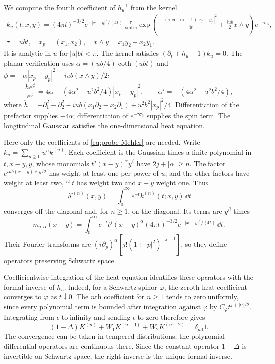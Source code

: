 \documentclass[11pt,letterpaper,reqno]{amsart}
\begin{document}
We compute the fourth coefficient of $h_u^{-1}$ from the kernel
\begin{multline}\label{eq:probe-Mehler}
 k_u(t;x,y)=(4\pi t)^{-3/2}e^{-|x-y|^2/(4t)}
 \frac{\tau}{\sinh\tau}\exp\left(-\frac{(\tau\coth\tau-1)|x_p-y_p|^2}{4t}
                           +\frac{iub}{2}x\wedge y\right)
 e^{-\tau\sigma_3},\\
 \tau=ubt,\quad x_p=(x_1,x_2),\quad x\wedge y=x_1y_2-x_2y_1.
\end{multline}
It is analytic in $u$ for $|u|bt<\pi$. The kernel satisfies
$(\partial_t+h_u-1)k_u=0$. The planar verification uses
$\alpha=(ub/4)\coth(ubt)$ and
$\phi=-\alpha|x_p-y_p|^2+iub(x\wedge y)/2$:
\[
 \frac{\check h e^\phi}{e^\phi}
   =4\alpha-(4\alpha^2-u^2b^2/4)|x_p-y_p|^2,
 \qquad \alpha'=-(4\alpha^2-u^2b^2/4),
\]
where $\check h=-\partial_1^2-\partial_2^2
-iub(x_1\partial_2-x_2\partial_1)+u^2b^2|x_p|^2/4$.
Differentiation of the prefactor supplies $-4\alpha$; differentiation
of $e^{-\tau\sigma_3}$ supplies the spin term. The longitudinal
Gaussian satisfies the one-dimensional heat equation.

Here only the coefficients of \eqref{eq:probe-Mehler} are needed.
Write $k_u=\sum_{n\ge0}u^nk^{(n)}$. Each coefficient is the Gaussian
times a finite polynomial in $t,x-y,y$, whose monomials
$t^j(x-y)^\alpha y^\beta$ have $2j+|\alpha|\ge n$.
The factor $e^{iub(x-y)\wedge y/2}$ has weight at least one per
power of $u$, and the other factors have weight at least two,
if $t$ has weight two and $x-y$ weight one.
Thus
\[
 K^{(n)}(x,y)=\int_0^\infty e^{-t}k^{(n)}(t;x,y)\,\dd t
\]
converges off the diagonal and, for $n\ge1$, on the diagonal.
Its terms are $y^\beta$ times
\[
 m_{j,\alpha}(x-y)=\int_0^\infty e^{-t}t^j(x-y)^\alpha
                 (4\pi t)^{-3/2}e^{-|x-y|^2/(4t)}\,\dd t.
\]
Their Fourier transforms are
$(i\partial_p)^\alpha[j!(1+|p|^2)^{-j-1}]$, so they define
operators preserving Schwartz space.

Coefficientwise integration of the heat equation identifies these
operators with the formal inverse of $h_u$. Indeed, for a Schwartz
spinor $\varphi$, the zeroth heat coefficient converges to $\varphi$
as $t\downarrow0$. The $n$th coefficient for $n\ge1$ tends to zero
uniformly, since every polynomial term is bounded after integration
against $\varphi$ by $C_\varphi t^{j+|\alpha|/2}$.
Integrating from $\epsilon$ to infinity and sending $\epsilon$ to
zero therefore gives
\[
 (1-\Delta)K^{(n)}+W_1K^{(n-1)}+W_2K^{(n-2)}=\delta_{n0}1.
\]
The convergence can be taken in tempered distributions; the
polynomial differential operators are continuous there. Since the
constant operator $1-\Delta$ is invertible on Schwartz space, the
right inverse is the unique formal inverse.
\end{document}

